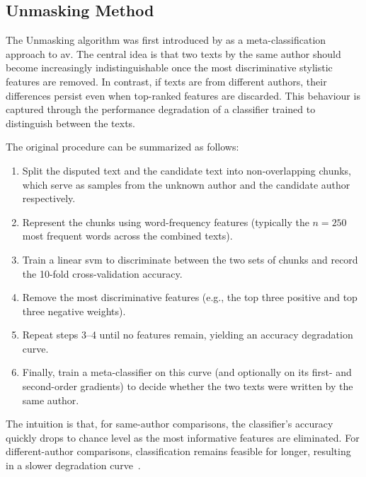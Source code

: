\subsection{Unmasking Method}
\label{subsec:unmasking}

The Unmasking algorithm was first introduced by \citet{koppel_authorship_2004} as a meta-classification approach to \ac{av}. 
The central idea is that two texts by the same author should become increasingly indistinguishable once the most discriminative stylistic features are removed. 
In contrast, if texts are from different authors, their differences persist even when top-ranked features are discarded. 
This behaviour is captured through the performance degradation of a classifier trained to distinguish between the texts.

The original procedure can be summarized as follows:
\begin{enumerate}
    \item Split the disputed text and the candidate text into non-overlapping chunks, which serve as samples from the unknown author and the candidate author respectively. 
    \item Represent the chunks using word-frequency features (typically the $n=250$ most frequent words across the combined texts).
    \item Train a linear \ac{svm} to discriminate between the two sets of chunks and record the 10-fold cross-validation accuracy.
    \item Remove the most discriminative features (e.g., the top three positive and top three negative weights).  
    \item Repeat steps 3–4 until no features remain, yielding an accuracy degradation curve.  
    \item Finally, train a meta-classifier on this curve (and optionally on its first- and second-order gradients) to decide whether the two texts were written by the same author.  
\end{enumerate}
The intuition is that, for same-author comparisons, the classifier’s accuracy quickly drops to chance level as the most informative features are eliminated. 
For different-author comparisons, classification remains feasible for longer, resulting in a slower degradation curve~\citep{stein_intrinsic_2011,tyo_state_2022,bevendorff_divergence_based_2020,stamatatos_survey_2009}. 

